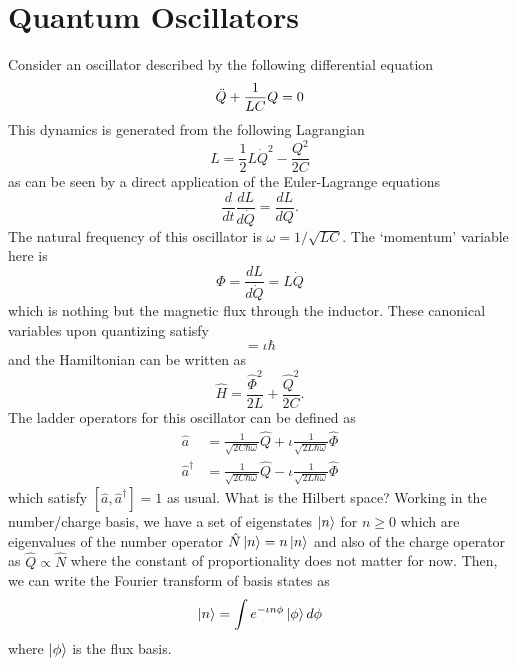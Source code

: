 \documentclass{article}
\begin{document}
\section{Quantum Oscillators}
Consider an oscillator described by the following differential equation
\begin{equation}
    \Ddot{Q} + \frac{1}{LC}Q = 0
\end{equation}
This dynamics is generated from the following Lagrangian
\begin{equation}
    L = \frac{1}{2}L\dot{Q}^2 - \frac{Q^2}{2C}
\end{equation}
as can be seen by a direct application of the Euler-Lagrange equations
\begin{equation}
    \frac{d}{dt}\frac{dL}{d\dot{Q}} = \frac{dL}{dQ}.
\end{equation}
The natural frequency of this oscillator is $\omega = 1/\sqrt{LC}$. The `momentum' variable here is 
\begin{equation}
    \Phi = \frac{dL}{d\dot{Q}} = L\dot{Q} 
\end{equation}
which is nothing but the magnetic flux through the inductor. These canonical variables upon quantizing satisfy
\begin{equation}
    [\hat{Q},\hat{\Phi}] = \iota\hbar 
\end{equation}
and the Hamiltonian can be written as
\begin{equation}
    \hat{H} = \frac{\hat{\Phi}^2}{2L} + \frac{\hat{Q}^2}{2C}.
\end{equation}
The ladder operators for this oscillator can be defined as
\begin{align}
    \hat{a} &= \frac{1}{\sqrt{2C\hbar\omega}}\hat{Q}  + \iota\frac{1}{\sqrt{2L\hbar\omega}}\hat{\Phi} \\
    \hat{a}^{\dagger} &= \frac{1}{\sqrt{2C\hbar\omega}}\hat{Q}  - \iota\frac{1}{\sqrt{2L\hbar\omega}}\hat{\Phi}
\end{align}
which satisfy $[\hat{a},\hat{a}^{\dagger}]=1$ as usual. What is the Hilbert space? Working in the number/charge basis, we have a set of eigenstates $\ket{n}$ for $n \geq 0$ which are eigenvalues of the number operator $\hat{N}\ket{n}=n\ket{n}$ and also of the charge operator as $\hat{Q} \propto \hat{N}$ where the constant of proportionality does not matter for now. Then, we can write the Fourier transform of basis states as
\begin{equation}
    \ket{n} = \int e^{-\iota n\phi} \ket{\phi} d\phi
\end{equation}
where $\ket{\phi}$ is the flux basis.
\end{document}

